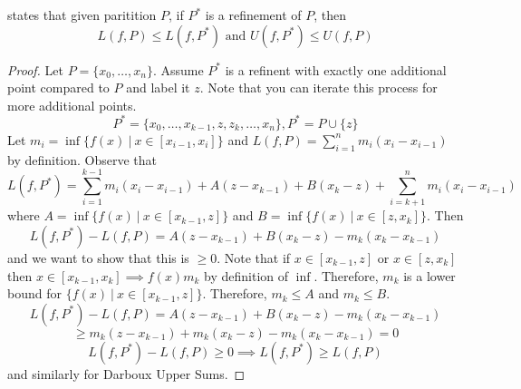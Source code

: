 \documentclass[12pt]{scrartcl}
\begin{document}
\begin{lemma}
   states that given paritition $P$, 
  if $P^*$ is a refinement of $P$, then 
  \[L(f, P) \leq L(f, P^*) \text{ and } U(f, P^*) \leq U(f, P)\]
  \begin{proof}
    Let $P = \{x_0, \ldots, x_n\}$. Assume $P^*$ is a refinent with 
    exactly one additional point compared to $P$ and label it $z$. 
    Note that you can iterate this process for more additional points.
    \[P^* = \{x_0, \ldots, x_{k-1}, z, z_k, \ldots, x_n\}, P^* = P \cup \{z\}\]
    Let $m_i = \inf\{f(x) \ | \ x \in [x_{i-1}, x_i]\}$ and $L(f, P) = \sum_{i=1}^n m_i(x_i - x_{i-1})$ 
    by definition. Observe that 
    \[L(f, P^*) = \sum_{i=1}^{k-1} m_i(x_i - x_{i-1}) + A(z - x_{k-1}) + B(x_k - z) + \sum_{i=k+1}^n m_i(x_i - x_{i-1})\]
    where $A = \inf\{f(x) \ | \ x \in [x_{k-1}, z]\}$ and 
    $B = \inf\{f(x) \ | \ x \in [z, x_k]\}$. Then 
    \[L(f, P^*) - L(f, P) = A(z - x_{k-1}) + B(x_k - z) - m_k(x_k - x_{k-1})\]
    and we want to show that this is $\geq 0$. Note that if $x \in [x_{k-1}, z]$ or $x \in [z, x_k]$
    then $x \in [x_{k-1}, x_k] \implies f(x) m_k$ by definition of $\inf$. 
    Therefore, $m_k$ is a lower bound for $\{f(x) \ | \ x \in [x_{k-1}, z]\}$. Therefore, 
    $m_k \leq A$ and $m_k \leq B$. 
    \[L(f, P^*) - L(f, P) = A(z-x_{k-1}) + B(x_k - z) - m_k(x_k - x_{k-1})\]
    \[\geq m_k(z-x_{k-1}) + m_k(x_k - z) - m_k(x_k - x_{k-1}) = 0\]
    \[L(f, P^*) - L(f, P) \geq 0 \implies L(f, P^*) \geq L(f, P)\]
    and similarly for Darboux Upper Sums.
  \end{proof}
\end{lemma}
\end{document}
